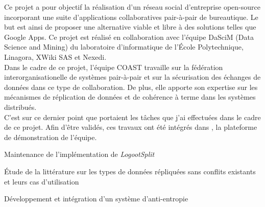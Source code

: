 \documentclass[]{deedy-resume-openfont}
\begin{document}
\hfill\begin{minipage}{\dimexpr\textwidth-0.5cm}
Ce projet a pour objectif la réalisation d'un réseau social d'entreprise open-source
incorporant une suite d'applications collaboratives pair-à-pair de bureautique.
Le but est ainsi de proposer une alternative viable et libre
à des solutions telles que Google Apps. Ce projet est réalisé en collaboration avec l’équipe DaSciM (Data Science and Mining)
du laboratoire d’informatique de l’École Polytechnique, Linagora, XWiki SAS et Nexedi.
\\
Dans le cadre de ce projet, l'équipe COAST travaille sur la fédération interorganisationelle
de systèmes pair-à-pair et sur la sécurisation des échanges de données dans ce type de collaboration.
De plus, elle apporte son expertise sur les mécanismes de réplication de données
et de cohérence à terme dans les systèmes distribués.
\\
C'est sur ce dernier point que portaient les tâches que j'ai effectuées dans le cadre de ce projet.
Afin d'être validés, ces travaux ont été intégrés dans \href{https://www.coedit.re}{},
la plateforme de démonstration de l'équipe.
\begin{tightemize}
\item Maintenance de l'implémentation de \emph{LogootSplit}\cite{sp2-l2-9}\cite{sp2-l2-10}
\item Étude de la littérature sur les types de données répliquées sans conflits existants et leurs cas d'utilisation
\item Développement et intégration d'un système d'anti-entropie\cite{sp2-l2-2}
\end{tightemize}
\sectionsep

\renewcommand\refname{\vskip -1.5cm} %


\nocite{*}


\end{minipage}
\end{document}
